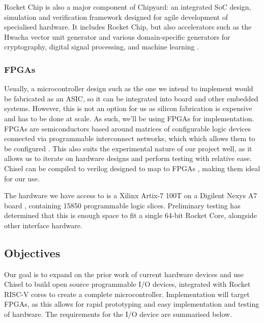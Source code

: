 \documentclass[a4paper,fleqn,12pt]{article}
\begin{document}
Rocket Chip is also a major component of Chipyard: an integrated SoC design, simulation and verification framework designed for agile development of specialised hardware. It includes Rocket Chip, but also accelerators such as the Hwacha vector unit generator and various domain-specific generators for cryptography, digital signal processing, and machine learning \citep{chipyard}.

\subsubsection{FPGAs}

Usually, a microcontroller design such as the one we intend to implement would be fabricated as an ASIC, so it can be integrated into board and other embedded systems. However, this is not an option for us as silicon fabrication is expensive and has to be done at scale. As such, we'll be using FPGAs for implementation. FPGAs are semiconductors based around matrices of configurable logic devices connected via programmable interconnect networks, which which allows them to be configured  \citep{whatisfpga}. This also suits the experimental nature of our project well, as it allows us to iterate on hardware designs and perform testing with relative ease. Chisel can be compiled to verilog designed to map to FPGAs \citep{chisel}, making them ideal for our use.

The hardware we have access to is a Xilinx Artix-7 100T on a Digilent Nexys A7 board \citep{digilent}, containing 15850 programmable logic slices. Preliminary testing has determined that this is enough space to fit a single 64-bit Rocket Core, alongside other interface hardware.

\subsection{Objectives}
Our goal is to expand on the prior work of current hardware devices and use Chisel to build open source programmable I/O devices, integrated with Rocket RISC-V cores to create a complete microcontroller. Implementation will target FPGAs, as this allows for rapid prototyping and easy implementation and testing of hardware. The requirements for the I/O device are summarised below.
\end{document}
